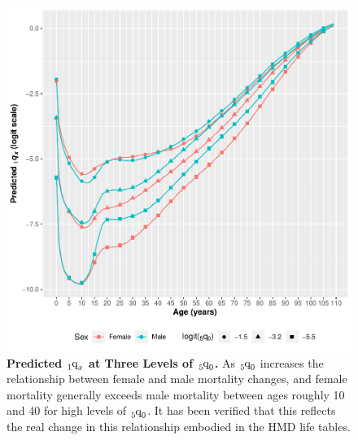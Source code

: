 \documentclass[11pt]{article}
\newcommand{\qf}{\tensor*[_5]{\mbox{q}}{_0}}
\newcommand{\qox}{\tensor*[_{1}]{\mbox{q}}{_{x}}}
\begin{document}
\begin{appendices}
\begin{figure}[htbp]
   \centering
   \includegraphics[width=0.94\linewidth]{../figures/fig6.pdf} 
   \captionsetup{format=plain,font=normalsize,margin=0cm,justification=justified}
   \caption{\textbf{Predicted $\qox$ at Three Levels of $\qf$.}  As $\qf$ increases the relationship between female and male mortality changes, and female mortality generally exceeds male mortality between ages roughly 10 and 40 for high levels of $\qf$.  It has been verified that this reflects the real change in this relationship embodied in the HMD life tables.}
   \label{fig:preds}
\end{figure}


\end{appendices}
\end{document}
